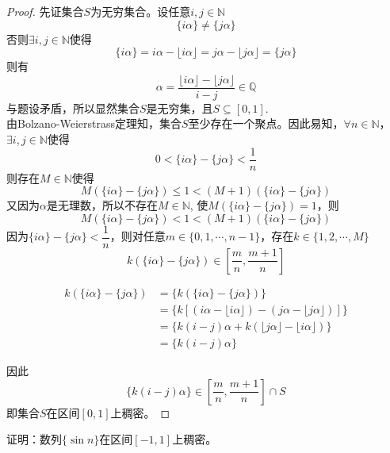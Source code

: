 \begin{proof}

    先证集合$S$为无穷集合。设任意$i, j \in \mathbb{N}$
    $$\{i\alpha\} \neq \{j\alpha\}$$
    否则$\exists i, j \in \mathbb{N}$使得
    $$\{i\alpha\} = i\alpha - \lfloor i\alpha \rfloor = j\alpha - \lfloor j\alpha \rfloor = \{j\alpha\}$$
    则有
    $$\alpha = \dfrac{\lfloor i\alpha \rfloor - \lfloor j\alpha \rfloor}{i - j} \in \mathbb{Q}$$
    与题设矛盾，所以显然集合$S$是无穷集，且$S \subseteq [0, 1]$. \\
    由\textup{Bolzano-Weierstrass}定理知，集合$S$至少存在一个聚点。因此易知，$\forall n \in \mathbb{N}$，$\exists i, j \in \mathbb{N}$使得
    $$0 < \{i\alpha\} - \{j\alpha\} < \dfrac{1}{n}$$
    则存在$M \in \mathbb{N}$使得
    $$M(\{i\alpha\} - \{j\alpha\}) \leq 1 < (M + 1)(\{i\alpha\} - \{j\alpha\})$$
    又因为$\alpha$是无理数，所以不存在$M \in \mathbb{N}$, 使$M(\{i\alpha\} - \{j\alpha\}) = 1$，则
    $$M(\{i\alpha\} - \{j\alpha\}) < 1 < (M + 1)(\{i\alpha\} - \{j\alpha\})$$
    因为$\{i\alpha\} - \{j\alpha\} < \dfrac{1}{n}$，则对任意$m \in \{0, 1, \cdots, n - 1\}$，存在$k \in \{1, 2, \cdots, M\}$
    $$k(\{i\alpha\} - \{j\alpha\}) \in \left[ \dfrac{m}{n}, \dfrac{m + 1}{n} \right]$$

    \begin{align*}
        k (\{ i \alpha \} - \{ j \alpha \}) & = \{ k (\{ i \alpha \} - \{ j \alpha \}) \} \\
        & = \{ k [(i \alpha - \lfloor i \alpha \rfloor) - (j \alpha - \lfloor j \alpha \rfloor)] \} \\
        & = \{ k (i - j) \alpha + k (\lfloor j \alpha \rfloor - \lfloor i \alpha \rfloor) \} \\
        & = \{ k (i - j) \alpha \}
    \end{align*}

    因此
    $$\{ k (i - j) \alpha \} \in \! \left[ \dfrac{m}{n}, \dfrac{m + 1}{n} \right] \cap S$$
    即集合$S$在区间$[0, 1]$上稠密。

\end{proof}

\begin{proposition}

    证明：数列$\{\sin{n}\}$在区间$[-1, 1]$上稠密。

\end{proposition}


